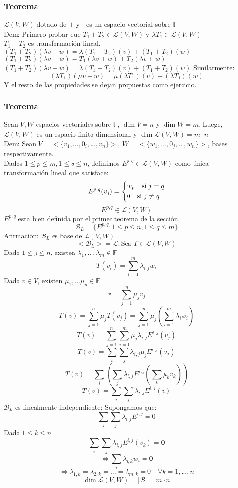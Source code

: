 \documentclass[11pt]{book}
\renewcommand{\vec}[1]{\mathbf{#1}}
\theoremstyle{definition}
\begin{document}
\subsubsection{Teorema}
$\mathcal{L}(V,W)$ dotado de $+$ y $\cdot$ es un espacio vectorial sobre $\mathbb{F}$\\
Dem: Primero probar que $T_1+T_2\in\mathcal{L}(V,W)$ y $\lambda T_1\in\mathcal{L}(V,W)$\\
$T_1+T_2$ es transformación lineal.\\
$(T_1+T_2)(\lambda v+w)=\lambda(T_1+T_2)(v)+(T_1+T_2)(w)$
$(T_1+T_2)(\lambda v+w)=T_1(\lambda v+w)+T_2(\lambda v+w)$
$(T_1+T_2)(\lambda v+w)=\lambda(T_1+T_2)(v)+(T_1+T_2)(w)$
Similarmente:
\[
(\lambda T_1)(\mu v+w)=\mu(\lambda T_1)(v)+(\lambda T_1)(w)
\]
Y el resto de las propiedades se dejan propuestas como ejercicio.
\subsubsection{Teorema}
Sean $V,W$ espacios vectoriales sobre $\mathbb{F}$, $\dim V=n$ y $\dim W=m$. Luego, $\mathcal{L}(V,W)$ es un espacio finito dimensional y $\dim\mathcal{L}(V,W)=m\cdot n$\\
Dem: Sean $V=<\{v_1,...,0_i,...,v_n\}>$, $W=<\{w_1,...,0_j,...,w_n\}>$, bases respectivamente.\\
Dados $1\leq p\leq m, 1\leq q\leq n$, definimos $E^{p,q}\in\mathcal{L}(V,W)$ como única transformación lineal que satisface:
\[
E^{p,q}(v_j)=
\begin{dcases}
	w_p\quad\textrm{si }j=q\\
	0\quad\textrm{si } j\neq q
\end{dcases}
\]
\[
E^{p,q}\in\mathcal{L}(V,W)
\]
$E^{p,q}$ esta bien definida por el primer teorema de la sección
\[
\mathcal{B}_L=\{E^{p,q}:1\leq p\leq n,1\leq q\leq m\}
\]
Afirmación: $\mathcal{B}_L$ es base de $\mathcal{L}(V,W)$
\[
<\mathcal{B}_L>=\mathcal{L}:\textrm{Sea }T\in\mathcal{L}(V,W)
\]
Dado $1\leq j\leq n$, existen $\lambda_1,...,\lambda_m\in\mathbb{F}$
\[
T(v_j)=\sum^m_{i=1}\lambda_{i,j}w_i
\]
Dado $v\in V$, existen $\mu_1,...\mu_n\in\mathbb{F}$
\[
v=\sum^n_{j=1}\mu_jv_j
\]
\[
T(v)=\sum^n_{j=1}\mu_jT(v_j)=\sum^n_{j=1}\mu_j(\sum^m_{i=1}\lambda_iw_i)
\]
\[
T(v)=\sum^n_{j=1}\sum^m_{i=1}\mu_j\lambda_{i,j}E^{i,j}(v_j)
\]
\[
T(v)=\sum_i\sum_j\lambda_{i,j}\mu_jE^{i,j}(v_j)
\]
\[
T(v)=\sum_i\left(\sum_j\lambda_{i,j}E^{i,j}\left(\sum_k\mu_kv_k\right)\right)
\]
\[
T(v)=\sum_i\sum_j\lambda_{i,j}E^{i,j}(v)
\]
$\mathcal{B}_L$ es linealmente independiente: Supongamos que:
\[
\sum_i\sum_j\lambda_{i,j}E^{i,j}=0
\]
Dado $1\leq k\leq n$
\[
\sum_i\sum_j\lambda_{i,j}E^{i,j}(v_k)=\vec{0}
\]
\[
\iff \sum_i\lambda_{i,k}w_i=\vec{0}
\]
\[
\iff \lambda_{1,k}=\lambda_{2,k}=...=\lambda_{m,k}=0\quad \forall k=1,...,n
\]
\[
\dim\mathcal{L}(V,W)=|\mathcal{B}|=m\cdot n
\]
\end{document}
